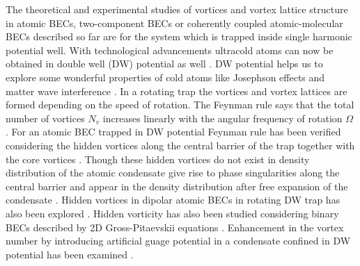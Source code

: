 \documentclass[10pt,a4paper]{article}
\begin{document}
The theoretical and experimental studies of vortices and vortex
lattice structure in atomic BECs, two-component BECs or coherently
coupled atomic-molecular BECs described so far are for the system
which is trapped inside single harmonic potential well. With
technological advancements ultracold atoms can now be obtained in
double well (DW) potential as well \cite{Albiez}. DW potential
helps us to explore some wonderful properties of cold atoms like
Josephson effects \cite{Levy} and matter wave interference
\cite{Andrews}. In a rotating trap the vortices and vortex
lattices are formed depending on the speed of rotation. The
Feynman rule says that the total number of vortices $N_v$
increases linearly with the angular frequency of rotation $\Omega$
\cite{Feynman}. For an atomic BEC trapped in DW potential Feynman
rule has been verified considering the hidden vortices along the
central barrier of the trap together with the core vortices
\cite{Wen_1, Mithun}. Though these hidden vortices do not exist in
density distribution of the atomic condensate give rise to phase
singularities along the central barrier and appear in the density
distribution after free expansion of the condensate \cite{Wen_1}.
Hidden vortices in dipolar atomic BECs in rotating DW trap has
also been explored \cite{Sabari}. Hidden vorticity has also been
studied considering binary BECs described by 2D Gross-Pitaevskii
equations \cite{Brtka}. Enhancement in the vortex number by
introducing artificial guage potential in a condensate confined in
DW potential has been examined \cite {Bai}.
\end{document}
